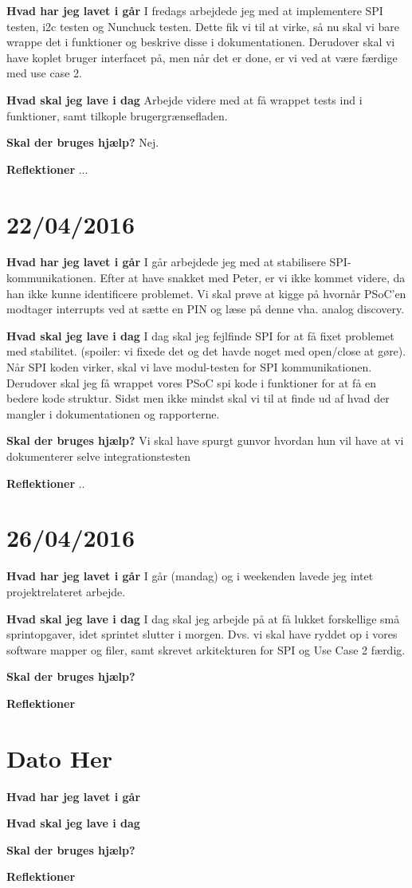 \documentclass{article}
\begin{document}
	\textbf{Hvad har jeg lavet i går}
	I fredags arbejdede jeg med at implementere SPI testen, i2c testen og Nunchuck testen. Dette fik vi til at virke, så nu skal vi bare wrappe det i funktioner og beskrive disse i dokumentationen. Derudover skal vi have koplet bruger interfacet på, men når det er done, er vi ved at være færdige med use case 2.
	
	\textbf{Hvad skal jeg lave i dag}
	Arbejde videre med at få wrappet tests ind i funktioner, samt tilkople brugergrænsefladen.
	
	\textbf{Skal der bruges hjælp?}
	Nej. 
	
	\textbf{Reflektioner}
	...
	
	\section{22/04/2016}
	
	\textbf{Hvad har jeg lavet i går}
	I går arbejdede jeg med at stabilisere SPI-kommunikationen. Efter at have snakket med Peter, er vi ikke kommet videre, da han ikke kunne identificere problemet. Vi skal prøve at kigge på hvornår PSoC'en modtager interrupts ved at sætte en PIN og læse på denne vha. analog discovery.
	
	\textbf{Hvad skal jeg lave i dag}
	I dag skal jeg fejlfinde SPI for at få fixet problemet med stabilitet. (spoiler: vi fixede det og det havde noget med open/close at gøre). Når SPI koden virker, skal vi lave modul-testen for SPI kommunikationen. Derudover skal jeg få wrappet vores PSoC spi kode i funktioner for at få en bedere kode struktur. Sidst men ikke mindst skal vi til at finde ud af hvad der mangler i dokumentationen og rapporterne.
	
	
	\textbf{Skal der bruges hjælp?}
	Vi skal have spurgt gunvor hvordan hun vil have at vi dokumenterer selve integrationstesten
	
	\textbf{Reflektioner}
	..
	
	
	\section{26/04/2016}
	
	\textbf{Hvad har jeg lavet i går}
	I går (mandag) og i weekenden lavede jeg intet projektrelateret arbejde.
	
	\textbf{Hvad skal jeg lave i dag}
	I dag skal jeg arbejde på at få lukket forskellige små sprintopgaver, idet sprintet slutter i morgen. Dvs. vi skal have ryddet op i vores software mapper og filer, samt skrevet arkitekturen for SPI og Use Case 2 færdig.
	
	\textbf{Skal der bruges hjælp?}
	
	\textbf{Reflektioner}
	
	
	\section{Dato Her}
	
	\textbf{Hvad har jeg lavet i går}
	
	\textbf{Hvad skal jeg lave i dag}
	
	\textbf{Skal der bruges hjælp?}
	
	\textbf{Reflektioner}
	
	
\end{document}
